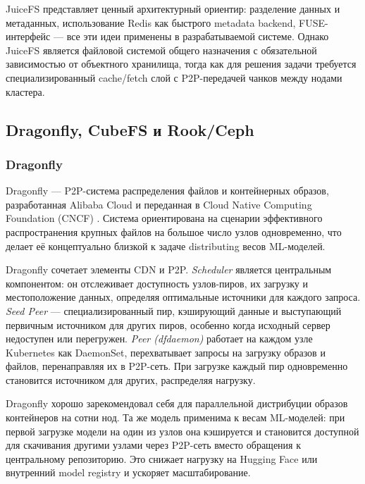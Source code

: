 JuiceFS представляет ценный архитектурный ориентир: разделение данных и метаданных, использование Redis как быстрого metadata backend, FUSE-интерфейс --- все эти идеи применены в разрабатываемой системе. Однако JuiceFS является файловой системой общего назначения с обязательной зависимостью от объектного хранилища, тогда как для решения задачи требуется специализированный cache/fetch слой с P2P-передачей чанков между нодами кластера.

\subsection{Dragonfly, CubeFS и Rook/Ceph}
\label{sec:alternatives}

\subsubsection{Dragonfly}

Dragonfly --- P2P-система распределения файлов и контейнерных образов, разработанная Alibaba Cloud и переданная в Cloud Native Computing Foundation (CNCF) \cite{dragonfly_blog}. Система ориентирована на сценарии эффективного распространения крупных файлов на большое число узлов одновременно, что делает её концептуально близкой к задаче distributing весов ML-моделей.

 Dragonfly сочетает элементы CDN и P2P. \textit{Scheduler} является центральным компонентом: он отслеживает доступность узлов-пиров, их загрузку и местоположение данных, определяя оптимальные источники для каждого запроса. \textit{Seed Peer} --- специализированный пир, кэширующий данные и выступающий первичным источником для других пиров, особенно когда исходный сервер недоступен или перегружен. \textit{Peer (dfdaemon)} работает на каждом узле Kubernetes как DaemonSet, перехватывает запросы на загрузку образов и файлов, перенаправляя их в P2P-сеть. При загрузке каждый пир одновременно становится источником для других, распределяя нагрузку.

 Dragonfly хорошо зарекомендовал себя для параллельной дистрибуции образов контейнеров на сотни нод. Та же модель применима к весам ML-моделей: при первой загрузке модели на один из узлов она кэшируется и становится доступной для скачивания другими узлами через P2P-сеть вместо обращения к центральному репозиторию. Это снижает нагрузку на Hugging Face или внутренний model registry и ускоряет масштабирование.

